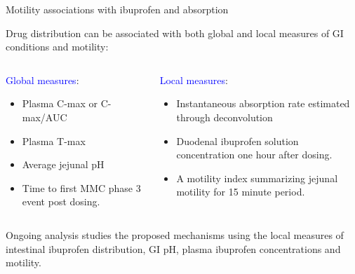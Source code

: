 \documentclass[]{beamer}
\begin{document}
\begin{frame}{Motility associations with ibuprofen and absorption}

	Drug distribution can be associated with both global and local measures of GI conditions and motility:

	\bigskip

	\begin{columns}[t]
		\begin{column}{.5\textwidth}
			\textcolor{blue}{Global measures}:
			\footnotesize
			\begin{itemize}
				\item Plasma C-max or C-max/AUC
				\item Plasma T-max
				\item Average jejunal pH
				\item Time to first MMC phase 3 event post dosing.
			\end{itemize}
		\end{column}
		\begin{column}{.5\textwidth}
			\small
			\textcolor{blue}{Local measures}:
			\footnotesize
			\begin{itemize}
				\item Instantaneous absorption rate estimated through deconvolution
				\item Duodenal ibuprofen solution concentration one hour after dosing.
				\item A motility index summarizing jejunal motility for 15 minute period.
			\end{itemize}
		\end{column}
	\end{columns}


	\bigskip

	Ongoing analysis studies the proposed mechanisms using the local measures of intestinal ibuprofen distribution, GI pH, plasma ibuprofen concentrations and motility.

\end{frame}

\end{document}
